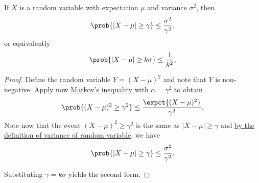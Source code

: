 \begin{flex}
\begin{theorem}
\label{thm:probability::expectation::chebyshev-inequality}
If $X$ is a random variable with expectation $\mu$ and variance $\sigma^2$,  
%
then
\[ 
\prob{|X - \mu| \geq \gamma} \leq \frac{\sigma^2}{\gamma^2}. 
\]
or equivalently
\[ 
\prob{|X - \mu| \geq k\sigma} \leq \frac{1}{k^2}, 
\]
\end{theorem}

\begin{proof}
Define the random variable $Y = (X - \mu)^2$  and note that $Y$ is non-negative.  
%
Apply now 
%
\href{thm:probability::expectation::markov-inequality}{Markov's inequality}
%
with $\alpha = \gamma^2$ to obtain
\[
\prob{(X - \mu)^2 \geq \gamma^2} \leq \frac{\expct{(X - \mu)^2}}{\gamma^2}. 
\]
Note now that the event $(X - \mu)^2 \geq \gamma^2$ is the same as $| X - \mu| \geq \gamma$ and
%
\href{def:probability::variance}{by the definition of variance of random variable},
%
we have
\[ 
\prob{|X - \mu| \geq \gamma} \leq \frac{\sigma^2}{\gamma^2}. 
\]

Substituting $\gamma = k \sigma$ yields the second form.
\end{proof}
\end{flex}
